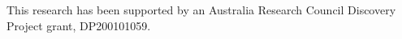 \documentclass[manuscript,review]{acmart}
\begin{document}
\begin{acks}
This research has been supported by an Australia Research Council Discovery Project grant, DP200101059.
\end{acks}



\end{document}
